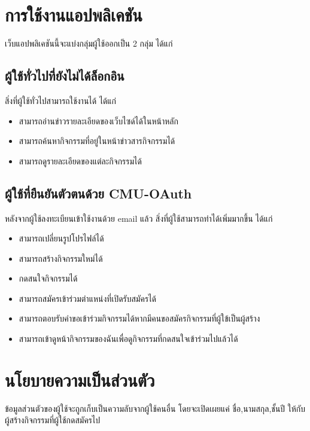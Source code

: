 \section{การใช้งานแอปพลิเคชัน}
เว็บแอปพลิเคชันนี้จะแบ่งกลุ่มผู้ใช้ออกเป็น 2 กลุ่ม ได้แก่
\subsection{ผู้ใช้ทั่วไปที่ยังไม่ได้ล็อกอิน}
สิ่งที่ผู้ใช้ทั่วไปสามารถใช้งานได้ ได้แก่
\begin{itemize}
    \item สามารถอ่านข่าวรายละเอียดของเว็บไซด์ได้ในหน้าหลัก
    \item สามารถค้นหากิจกรรมที่อยู่ในหน้าข่าวสารกิจกรรมได้
    \item สามารถดูรายละเอียดของแต่ละกิจกรรมได้
\end{itemize}
\subsection{ผู้ใช้ที่ยืนยันตัวตนด้วย CMU-OAuth}
หลังจากผู้ใช้ลงทะเบียนเข้าใช้งานด้วย email แล้ว สิ่งที่ผู้ใช้สามารถทำได้เพิ่มมากขึ้น ได้แก่
\begin{itemize}
    \item สามารถเปลี่ยนรูปโปรไฟล์ได้
    \item สามารถสร้างกิจกรรมใหม่ได้
    \item กดสนใจกิจกรรมได้
    \item สามารถสมัครเข้าร่วมตำแหน่งที่เปิดรับสมัครได้
    \item สามารถตอบรับคำขอเข้าร่วมกิจกรรมได้หากมีคนขอสมัครกิจกรรมที่ผู้ใข้เป็นผู้สร้าง
    \item สามารถเข้าดูหน้ากิจกรรมของฉันเพื่อดูกิจกรรมที่กดสนใจเข้าร่วมไปแล้วได้
\end{itemize}
\section{นโยบายความเป็นส่วนตัว}
ข้อมูลส่วนตัวของผู้ใช้จะถูกเก็บเป็นความลับจากผู้ใช้คนอื่น โดยจะเปิดเผยแค่ ชื่อ,นามสกุล,ชั้นปี ให้กับผู้สร้างกิจกรรมที่ผู้ใช้กดสมัครไป
